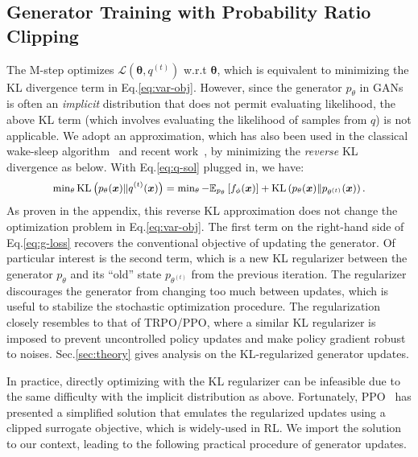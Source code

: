 \documentclass{article}
\newcommand{\0}{\bm{0}}
\newcommand{\E}{\mathbb{E}}
\newcommand{\KLD}{\text{KL}}
\newcommand{\x}{\bm{x}}
\begin{document}
\subsection{Generator Training with Probability Ratio Clipping}\label{sec:method:gen}

The M-step optimizes $\mathcal{L}(\bm{\theta}, q^{(t)})$ w.r.t $\bm{\theta}$, which is equivalent to minimizing the KL divergence term in Eq.\eqref{eq:var-obj}. However, since the generator $p_\theta$ in GANs is often an \emph{implicit} distribution that does not permit evaluating likelihood, the above KL term (which involves evaluating the likelihood of samples from $q$) is not applicable. We adopt an approximation, which has also been used in the classical wake-sleep algorithm~\cite{hinton1995wake} and recent work~\cite{hu2018deep}, by minimizing the \emph{reverse} KL divergence as below. With Eq.\eqref{eq:q-sol} plugged in, we have:
\begin{equation}
\small
\begin{split}
\min\nolimits_\theta \KLD\left( p_\theta(\x) \| q^{(t)}(\x) \right) = \min\nolimits_\theta - \E_{p_\theta}\left[ f_\phi(\x) \right] + \KLD\left( p_\theta(\x) \| p_{\theta^{(t)}}(\x) \right).
\end{split}
\label{eq:g-loss}
\end{equation}
As proven in the appendix, this reverse KL approximation does not change the optimization problem in Eq.\eqref{eq:var-obj}. 
The first term on the right-hand side of Eq.\eqref{eq:g-loss} recovers the conventional objective of updating the generator. Of particular interest is the second term, which is a new KL regularizer between the generator $p_\theta$ and its ``old'' state $p_{\theta^{(t)}}$ from the previous iteration. The regularizer discourages the generator from changing too much between updates, which is useful to stabilize the stochastic optimization procedure. The regularization closely resembles to that of TRPO/PPO, where a similar KL regularizer is imposed to prevent uncontrolled policy updates and make policy gradient robust to noises. Sec.\ref{sec:theory} gives  analysis on the KL-regularized generator updates.

In practice, directly optimizing with the KL regularizer can be infeasible due to the same difficulty with the implicit distribution as above. Fortunately, PPO~\cite{PPO} has presented a simplified solution that emulates the regularized updates using a clipped surrogate objective, which is widely-used in RL. We import the solution to our context, leading to the following practical procedure of generator updates.
\end{document}
